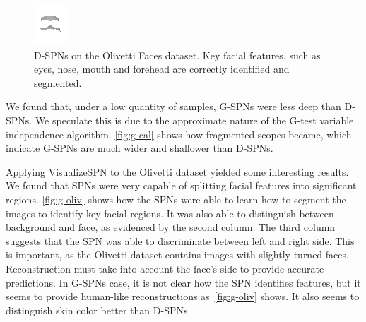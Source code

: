 \documentclass{article}
\begin{document}
\begin{figure}[!b]
\begin{minipage}[c]{.21\linewidth}
    \centering\centerline{\includegraphics[width=\linewidth]{imgs/dennis_oliv/0/sums/1054_1325.png}}
  \end{minipage}
  \caption{D-SPNs on the Olivetti Faces dataset. Key facial features, such as eyes, nose, mouth and
    forehead are correctly identified and segmented.\label{fig:g-oliv}}
\end{figure}

We found that, under a low quantity of samples, G-SPNs were less deep than D-SPNs. We speculate
this is due to the approximate nature of the G-test variable independence algorithm.
\autoref{fig:g-cal} shows how fragmented scopes became, which indicate G-SPNs are much wider and
shallower than D-SPNs.

Applying VisualizeSPN to the Olivetti dataset yielded some interesting results. We found that SPNs
were very capable of splitting facial features into significant regions. \autoref{fig:g-oliv} shows
how the SPNs were able to learn how to segment the images to identify key facial regions. It was
also able to distinguish between background and face, as evidenced by the second column. The third
column suggests that the SPN was able to discriminate between left and right side. This is
important, as the Olivetti dataset contains images with slightly turned faces. Reconstruction must
take into account the face's side to provide accurate predictions. In G-SPNs case, it is not clear
how the SPN identifies features, but it seems to provide human-like reconstructions
as~\autoref{fig:g-oliv} shows. It also seems to distinguish skin color better than D-SPNs.
\end{document}
